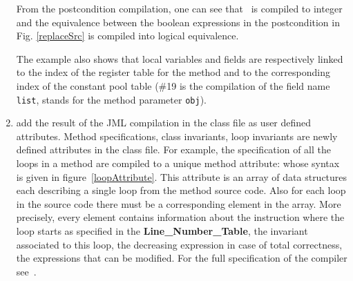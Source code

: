 \begin{enumerate}
From the postcondition compilation, one can see that \result \ is compiled to integer and the equivalence between the boolean expressions in the postcondition in Fig. \ref{replaceSrc}  is compiled into logical equivalence.

The example also shows that local variables and  fields are respectively linked to the index of the register table for the method and to the corresponding index of the constant pool table (\#19 is the compilation of the field name \texttt{list},  stands for the method parameter \texttt{obj}). 


\item add the result of the JML compilation in the class file as user defined attributes. Method specifications, class invariants, loop invariants are 
newly defined attributes in the class file.
 For example, the specification of all the loops in a method are compiled to a unique method attribute: whose syntax is given in figure~\ref{loopAttribute}. This attribute is an array of data structures each describing a single loop from the method source code. Also for each loop in the source code there must be a corresponding element in the array. 
More precisely, every element contains information about the instruction where the loop starts as specified in the
\textbf{Line\_Number\_Table}, the invariant associated to this loop, the decreasing expression in case of total correctness, the expressions that can be modified. 
For the full specification of the compiler see~\cite{JML2BCSpec}.
\end{enumerate}

